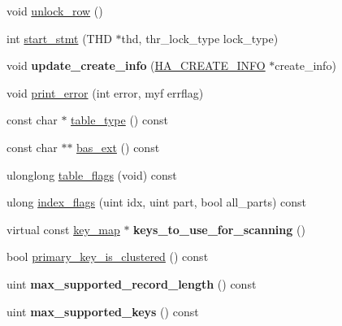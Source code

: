\begin{DoxyCompactItemize}
\item 
void \mbox{\hyperlink{classha__ndbcluster_aecef434c45b2c6c35a584274c5079e4b}{unlock\+\_\+row}} ()
\item 
int \mbox{\hyperlink{classha__ndbcluster_aa8f1c0c15ca6a002403699eec20f24e6}{start\+\_\+stmt}} (T\+HD $\ast$thd, thr\+\_\+lock\+\_\+type lock\+\_\+type)
\item 
\mbox{\label{classha__ndbcluster_aa1da5294f30d3fd5b8d06fa3177b78a3}} 
void {\bfseries update\+\_\+create\+\_\+info} (\mbox{\hyperlink{structst__ha__create__information}{H\+A\+\_\+\+C\+R\+E\+A\+T\+E\+\_\+\+I\+N\+FO}} $\ast$create\+\_\+info)
\item 
void \mbox{\hyperlink{classha__ndbcluster_ab4b4b9ed3726be8a4a0887785a5ed530}{print\+\_\+error}} (int error, myf errflag)
\item 
const char $\ast$ \mbox{\hyperlink{classha__ndbcluster_a96d160419836ac20e131570a32e1c4a8}{table\+\_\+type}} () const
\item 
const char $\ast$$\ast$ \mbox{\hyperlink{classha__ndbcluster_ade5341ce688c24b5885145f821cdf249}{bas\+\_\+ext}} () const
\item 
ulonglong \mbox{\hyperlink{classha__ndbcluster_a99dc30c67efa4a7d6d6f3ded9a67b40b}{table\+\_\+flags}} (void) const
\item 
ulong \mbox{\hyperlink{classha__ndbcluster_a129ea7ed14c99a3437beff5fece3e832}{index\+\_\+flags}} (uint idx, uint part, bool all\+\_\+parts) const
\item 
\mbox{\label{classha__ndbcluster_adfe1c99749c9718d4e5b5869b6cf281b}} 
virtual const \mbox{\hyperlink{classBitmap_3_0164_01_4}{key\+\_\+map}} $\ast$ {\bfseries keys\+\_\+to\+\_\+use\+\_\+for\+\_\+scanning} ()
\item 
bool \mbox{\hyperlink{classha__ndbcluster_abf1a2f928fcc952bbe31d8c496ef0dce}{primary\+\_\+key\+\_\+is\+\_\+clustered}} () const
\item 
\mbox{\label{classha__ndbcluster_a52e5a379a50e92037eff906a993a8755}} 
uint {\bfseries max\+\_\+supported\+\_\+record\+\_\+length} () const
\item 
\mbox{\label{classha__ndbcluster_a8cfa4181a4c99accd9d90ac9318cbb81}} 
uint {\bfseries max\+\_\+supported\+\_\+keys} () const
\item 
\mbox{\label{classha__ndbcluster_aeaa7b1e989313d552722d03ffb39691a}} 
$$
\end{DoxyCompactItemize}
